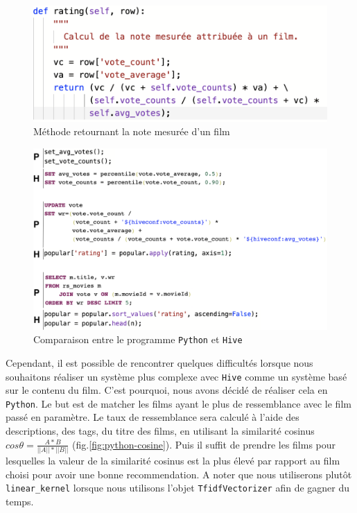 \documentclass[a4paper, 12pt, oneside]{book}
\newcounter{program}[subsection]
\begin{document}
\begin{figure}[H]
  \centering
  \includegraphics[width=1.0\textwidth]{images/python-wr}
  \caption{Méthode retournant la note mesurée d'un film}
  \label{fig:python-wr}
\end{figure}

\begin{figure}[H]
  \centering
  \includegraphics[width=1.0\textwidth]{images/python-hive}
  \caption{Comparaison entre le programme \texttt{Python} et \texttt{Hive}}
  \label{fig:python-hive}
\end{figure}

Cependant, il est possible de rencontrer quelques difficultés lorsque nous souhaitons réaliser un système plus complexe avec \texttt{Hive} comme un système basé sur le contenu du film. C'est pourquoi, nous avons décidé de réaliser cela en \texttt{Python}. Le but est de matcher les films ayant le plus de ressemblance  avec le film passé en paramètre. Le taux de ressemblance sera calculé à l'aide des descriptions, des tags, du titre des films, en utilisant la similarité cosinus $ cos \theta = \frac{A * B}{||A|| * ||B||} $ (fig.\ref{fig:python-cosine}). Puis il suffit de prendre les films pour lesquelles la valeur de la similarité cosinus est la plus élevé par rapport au film choisi pour avoir une bonne recommendation. A noter que nous utiliserons plutôt \texttt{linear\_kernel} lorsque nous utilisons l'objet \texttt{TfidfVectorizer} afin de gagner du temps.
\end{document}
